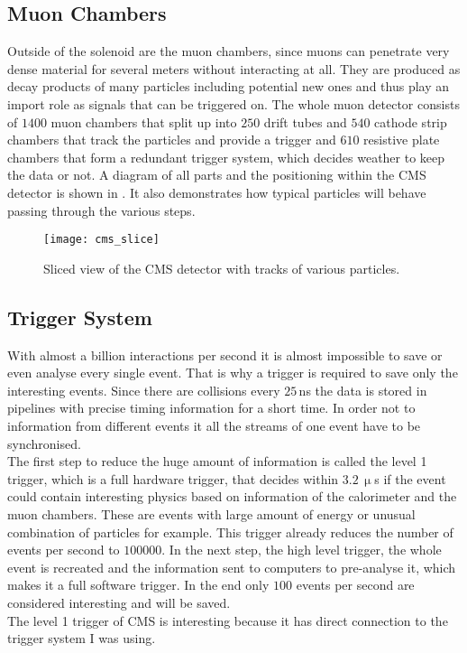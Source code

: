 \subsection{Muon Chambers}
Outside of the solenoid are the muon chambers, since muons can penetrate very dense material for several meters without interacting at all. They are produced as decay products of many particles including potential new ones and thus play an import role as signals that can be triggered on. The whole muon detector consists of $1400$ muon chambers that split up into $250$ drift tubes and $540$ cathode strip chambers that track the particles and provide a trigger and $610$ resistive plate chambers that form a redundant trigger system, which decides weather to keep the data or not.\as 
A diagram of all parts and the positioning within the \ac{CMS} detector is shown in . It also demonstrates how typical particles will behave passing through the various steps.
\begin{figure}[ht]
	\centering
	\texttt{[image: cms\_slice]}
	\caption{Sliced view of the CMS detector with tracks of various particles.}
	\label{p20}
\end{figure}
\subsection{Trigger System}
With almost a billion interactions per second it is almost impossible to save or even analyse every single event. That is why a trigger is required to save only the interesting events. Since there are collisions every $25\,$ns the data is stored in pipelines with precise timing information for a short time. In order not to information from different events it all the streams of one event have to be synchronised. \\
The first step to reduce the huge amount of information is called the level 1 trigger, which is a full hardware trigger, that decides within $3.2\,\upmu$s if the event could contain interesting physics based on information of the calorimeter and the muon chambers. These are events with large amount of energy or unusual combination of particles for example. This trigger already reduces the number of events per second to $100000$. In the next step, the high level trigger, the whole event is recreated and the information sent to computers to pre-analyse it, which makes it a full software trigger. In the end only $100$ events per second are considered interesting and will be saved.\\ 
The level 1 trigger of \ac{CMS} is interesting because it has direct connection to the trigger system I was using. 
